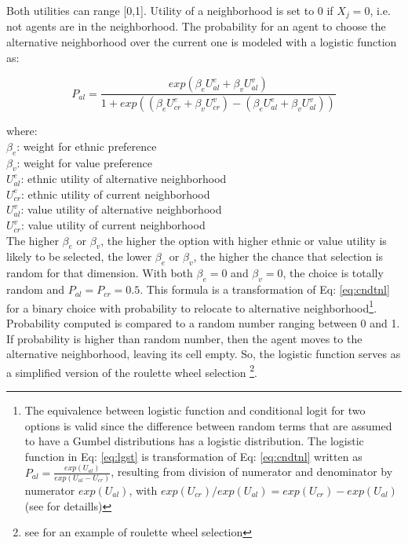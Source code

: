 \documentclass{article}
\begin{document}
Both utilities can range [0,1]. Utility of a neighborhood is set to 0 if $X_j = 0$, i.e. not agents are in the neighborhood. The probability for an agent to choose the alternative neighborhood over the current one is modeled with a logistic function as:

\begin{equation}
    P_{al} = \frac{exp(\beta_e U^e_{al} + \beta_v U^v_{al})}{1 + exp((\beta_e U^e_{cr} + \beta_v U^v_{cr}) - (\beta_e U^e_{al} + \beta_v U^v_{al}))}
    \label{eq:lgst}
\end{equation}


where: \\
$\beta_e$: weight for ethnic preference \\
$\beta_v$: weight for value preference\\
$U^e_{al}$: ethnic utility of alternative neighborhood\\
$U^e_{cr}$: ethnic utility of current neighborhood\\
$U^v_{al}$: value utility of alternative neighborhood\\
$U^v_{cr}$: value utility of current neighborhood\\

The higher $\beta_e$ or $\beta_v$, the higher the option with higher ethnic or value utility is likely to be selected, the lower $\beta_e$ or $\beta_v$, the higher the chance that selection is random for that dimension. With both $\beta_e = 0$ and $\beta_v = 0$, the choice is totally random and $P_{al} = P_{cr} = 0.5$. This formula is a transformation of Eq: \ref{eq:cndtnl} for a binary choice with probability to relocate to alternative neighborhood\footnote{The equivalence between logistic function  and conditional logit for two options is valid since the difference between random terms that are assumed to have a Gumbel distributions has a logistic distribution. The logistic function in Eq: \ref{eq:lgst} is transformation of Eq: \ref{eq:cndtnl} written as $P_{al} = \frac{exp(U_{al})}{exp(U_{al}-U_{cr})}$, resulting from division of numerator and denominator by numerator $exp(U_{al})$, with $exp(U_{cr})/exp(U_{al}) = exp(U_{cr}) - exp(U_{al})$ (see \textcite[p.39]{train2009discrete} for detaills)}.
Probability computed is compared to a random number ranging between 0 and 1. If probability is higher than random number, then the agent moves to the alternative neighborhood, leaving its cell empty. So,  the logistic  function serves as a simplified version of the roulette wheel selection \footnote{see \textcite{bruch2012methodological} for an example of roulette wheel selection}.
\end{document}
